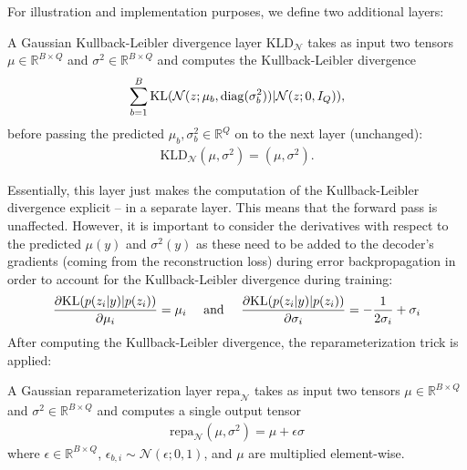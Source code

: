 For illustration and implementation purposes, we define two additional layers:

\begin{definition}
  \label{def:shape-prior-kld-layer}
  A Gaussian Kullback-Leibler divergence layer $\text{KLD}_{\mathcal{N}}$
  takes as input two tensors $\mu \in \mathbb{R}^{B \times Q}$ and
  $\sigma^2 \in \mathbb{R}^{B \times Q}$ and computes the Kullback-Leibler
  divergence
  \begin{align}
    \sum_{b = 1}^B \mathrm{KL}(\mathcal{N}(z;\mu_b,\mathrm{diag}(\sigma_b^2)) | \mathcal{N}(z;0,I_Q)),
  \end{align}
  before passing the predicted $\mu_b, \sigma_b^2 \in \mathbb{R}^Q$
  on to the next layer (unchanged):
  \begin{align}
    \text{KLD}_{\mathcal{N}}(\mu, \sigma^2) = (\mu, \sigma^2).
  \end{align}
\end{definition}

Essentially, this layer just makes the computation of the Kullback-Leibler
divergence explicit -- in a separate layer. This means that the forward pass
is unaffected. However, it is important to consider the derivatives
with respect to the predicted $\mu(y)$ and $\sigma^2(y)$ as these
need to be added to the decoder's gradients (coming from the reconstruction loss)
during error backpropagation in order to account for the Kullback-Leibler divergence
during training:
\begin{align}
  \frac{\partial \mathrm{KL}(p(z_i|y) | p(z_i))}{\partial \mu_i} = \mu_i
  \quad\text{ and }\quad
  \frac{\partial \mathrm{KL}(p(z_i|y) | p(z_i))}{\partial \sigma_i} = - \frac{1}{2\sigma_i} + \sigma_i
\end{align}
After computing the Kullback-Leibler divergence, the reparameterization trick
is applied:

\begin{definition}
  \label{def:shape-prior-repa-layer}
  A Gaussian reparameterization layer $\text{repa}_{\mathcal{N}}$
  takes as input two tensors $\mu \in \mathbb{R}^{B \times Q}$ and
  $\sigma^2 \in \mathbb{R}^{B \times Q}$ and computes a single output
  tensor
  \begin{align}
    \text{repa}_{\mathcal{N}}(\mu, \sigma^2) = \mu + \epsilon \sigma
    \label{eq:shape-prior-repa-layer}
  \end{align}
  where $\epsilon \in \mathbb{R}^{B \times Q}$,
  $\epsilon_{b,i} \sim \mathcal{N}(\epsilon;0,1)$, and $\mu$ are multiplied
  element-wise.
\end{definition}

